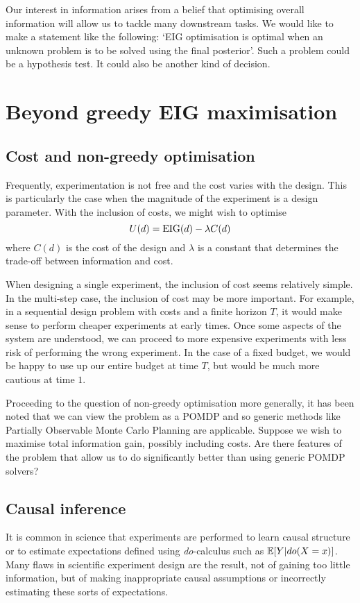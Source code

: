 Our interest in information arises from a belief that optimising overall information will allow us to tackle many downstream tasks. We would like to make a statement like the following: `EIG optimisation is optimal when an unknown problem is to be solved using the final posterior'. Such a problem could be a hypothesis test. It could also be another kind of decision.


\section{Beyond greedy EIG maximisation}
\subsection{Cost and non-greedy optimisation}
Frequently, experimentation is not free and the cost varies with the design. This is particularly the case when the magnitude of the experiment is a design parameter. With the inclusion of costs, we might wish to optimise
\begin{equation}
	U(d) = \text{EIG}(d) - \lambda C(d)
\end{equation}
where $C(d)$ is the cost of the design and $\lambda$ is a constant that determines the trade-off between information and cost.

When designing a single experiment, the inclusion of cost seems relatively simple. In the multi-step case, the inclusion of cost may be more important. For example, in a sequential design problem with costs and a finite horizon $T$, it would make sense to perform cheaper experiments at early times. Once some aspects of the system are understood, we can proceed to more expensive experiments with less risk of performing the wrong experiment. In the case of a fixed budget, we would be happy to use up our entire budget at time $T$, but would be much more cautious at time $1$.

Proceeding to the question of non-greedy optimisation more generally, it has been noted that we can view the problem as a POMDP and so generic methods like Partially Observable Monte Carlo Planning \cite{pomcp} are applicable. Suppose we wish to maximise total information gain, possibly including costs. Are there features of the problem that allow us to do significantly better than using generic POMDP solvers?

\subsection{Causal inference}
It is common in science that experiments are performed to learn causal structure or to estimate expectations defined using \textit{do}-calculus \cite{pearl2009causal} such as $\mathbb{E}[Y | do(X=x)]$. Many flaws in scientific experiment design are the result, not of gaining too little information, but of making inappropriate causal assumptions or incorrectly estimating these sorts of expectations.

